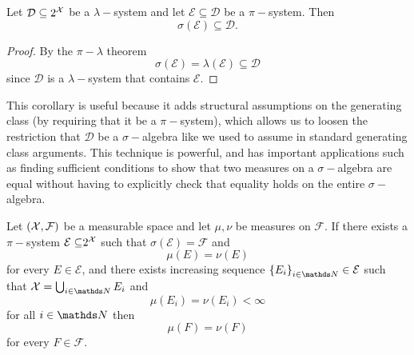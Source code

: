 \begin{cor}
\label{cor:piLambdaGeneratingClassArg}Let $\mathcal{D}\subseteq2^{\mathcal{X}}$
be a $\lambda-$system and let $\mathcal{E}\subseteq\mathcal{D}$
be a $\pi-$system. Then
\[
\sigma\left(\mathcal{E}\right)\subseteq\mathcal{D}.
\]
\end{cor}

\begin{proof}
By the $\pi-\lambda$ theorem
\[
\sigma\left(\mathcal{E}\right)=\lambda\left(\mathcal{E}\right)\subseteq\mathcal{D}
\]
since $\mathcal{D}$ is a $\lambda-$system that contains $\mathcal{E}$.
\end{proof}
This corollary is useful because it adds structural assumptions on
the generating class (by requiring that it be a $\pi-$system), which
allows us to loosen the restriction that $\mathcal{D}$ be a $\sigma-$algebra
like we used to assume in standard generating class arguments. This
technique is powerful, and has important applications such as finding
sufficient conditions to show that two measures on a $\sigma-$algebra
are equal without having to explicitly check that equality holds on
the entire $\sigma-$algebra.
\begin{thm}
 \label{thm:uniquenessMeasures}Let $\left(\mathcal{X},\mathcal{F}\right)$
be a measurable space and let $\mu,\nu$ be measures on $\mathcal{F}$.
If there exists a $\pi-$system $\mathcal{E\subseteq}2^{\mathcal{X}}$ such
that $\sigma\left(\mathcal{E}\right)=\mathcal{F}$ and 
\[
\mu\left(E\right)=\nu\left(E\right)
\]
for every $E\in\mathcal{E}$, and there exists increasing sequence
$\left\{ E_{i}\right\} _{i\in\N}\in\mathcal{E}$ such that $\X=\bigcup_{i\in\N}E_{i}$
and
\[
\mu\left(E_{i}\right)=\nu\left(E_{i}\right)<\infty
\]
for all $i\in\N$ then
\[
\mu\left(F\right)=\nu\left(F\right)
\]
for every $F\in\mathcal{F}$.
\end{thm}

